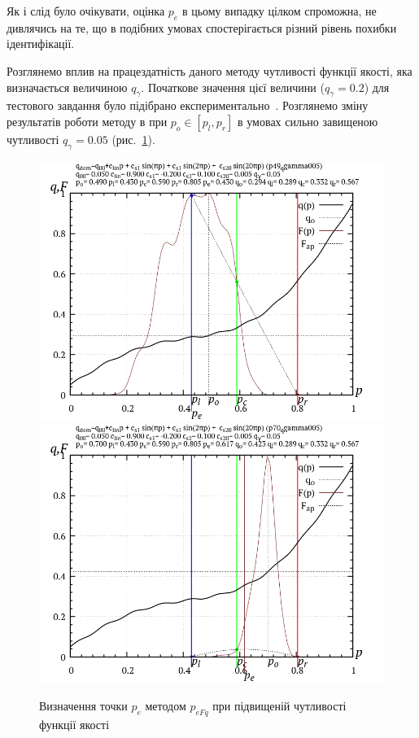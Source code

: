 Як і слід було очікувати, оцінка $p_e$ в цьому випадку цілком спроможна, не
дивлячись на те, що в подібних умовах спостерігається різний рівень похибки
ідентифікації.

Розглянемо вплив на працездатність даного методу чутливості
функції якості, яка визначається величиною
$ q_\gamma$. Початкове значення цієї величини
($ q_\gamma = 0.2$) для тестового завдання було підібрано
експериментально~\cite{atu_asau22}. Розглянемо зміну результатів
роботи методу в при
$ p_o \in [p_l, p_r] $ в умовах сильно завищеною чутливості
$ q_\gamma = 0.05 $ (рис.~\ref{atu:f:p_eFq_intra_005}).


\begin{figure}[htb!]
  \begin{center}
    \includegraphics[width=49\TW]{p/p_eFq/q_p_eFq_p49_qgamma005.png}
    \hfill
    \includegraphics[width=49\TW]{p/p_eFq/q_p_eFq_p70_qgamma005.png}
  \end{center}
\caption{Визначення точки $ p_e $ методом $ p_{eFq} $ при підвищеній чутливості функції якості}
  \label{atu:f:p_eFq_intra_005}
\end{figure}

